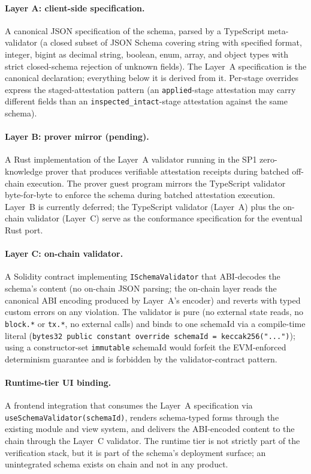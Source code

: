 \documentclass[11pt,a4paper]{article}
\theoremstyle{definition}
\theoremstyle{remark}
\begin{document}
\paragraph{Layer A: client-side specification.}
A canonical JSON specification of the schema, parsed by a TypeScript
meta-validator (a closed subset of JSON Schema covering string with
specified format, integer, bigint as decimal string, boolean, enum,
array, and object types with strict closed-schema rejection of
unknown fields). The Layer~A specification is the canonical
declaration; everything below it is derived from it. Per-stage
overrides express the staged-attestation pattern (an
\texttt{applied}-stage attestation may carry different fields than
an \texttt{inspected\_intact}-stage attestation against the same
schema).

\paragraph{Layer B: prover mirror (pending).}
A Rust implementation of the Layer~A validator running in the SP1
zero-knowledge prover that produces verifiable attestation receipts
during batched off-chain execution. The prover guest program mirrors
the TypeScript validator byte-for-byte to enforce the schema during
batched attestation execution. Layer~B is currently deferred; the
TypeScript validator (Layer~A) plus the on-chain validator (Layer~C)
serve as the conformance specification for the eventual Rust port.

\paragraph{Layer C: on-chain validator.}
A Solidity contract implementing \texttt{ISchemaValidator} that
ABI-decodes the schema's content (no on-chain JSON parsing; the
on-chain layer reads the canonical ABI encoding produced by Layer~A's
encoder) and reverts with typed custom errors on any violation. The
validator is pure (no external state reads, no \texttt{block.*} or
\texttt{tx.*}, no external calls) and binds to one schemaId via a
compile-time literal (\texttt{bytes32 public constant override
schemaId = keccak256("...")}); using a constructor-set
\texttt{immutable} schemaId would forfeit the EVM-enforced
determinism guarantee and is forbidden by the validator-contract
pattern.

\paragraph{Runtime-tier UI binding.}
A frontend integration that consumes the Layer~A specification via
\texttt{useSchemaValidator(schemaId)}, renders schema-typed forms
through the existing module and view system, and delivers the
ABI-encoded content to the chain through the Layer~C validator. The
runtime tier is not strictly part of the verification stack, but it
is part of the schema's deployment surface; an unintegrated schema
exists on chain and not in any product.
\end{document}

